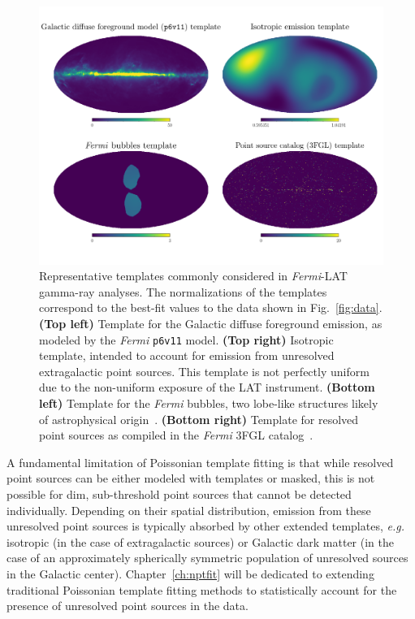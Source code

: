 \begin{figure}[htbp] 
\centering
 \includegraphics[width=1.0\textwidth]{ch-intro/templates.pdf}
\caption{Representative templates commonly considered in \emph{Fermi}-LAT gamma-ray analyses. The normalizations of the templates correspond to the best-fit values to the data shown in Fig.~\ref{fig:data}. \textbf{(Top left)} Template for the Galactic diffuse foreground emission, as modeled by the  {\it Fermi} \texttt{p6v11} model. \textbf{(Top right)} Isotropic template, intended to account for emission from unresolved extragalactic point sources. This template is not perfectly uniform due to the non-uniform exposure of the LAT instrument. \textbf{(Bottom left)} Template for the \emph{Fermi} bubbles, two lobe-like structures likely of astrophysical origin~\cite{Su:2010qj,Fermi-LAT:2014sfa}. \textbf{(Bottom right)} Template for resolved point sources as compiled in the \emph{Fermi} 3FGL catalog~\cite{Acero:2015hja}.}  
\label{fig:templates}
\end{figure}

A fundamental limitation of Poissonian template fitting is that while resolved point sources can be either modeled with templates or masked, this is not possible for dim, sub-threshold point sources that cannot be detected individually. Depending on their spatial distribution, emission from these unresolved point sources is typically absorbed by other extended templates, \emph{e.g.} isotropic (in the case of extragalactic sources) or Galactic dark matter (in the case of an approximately spherically symmetric population of unresolved sources in the Galactic center). Chapter~\ref{ch:nptfit} will be dedicated to extending traditional Poissonian template fitting methods to statistically account for the presence of unresolved point sources in the data.

